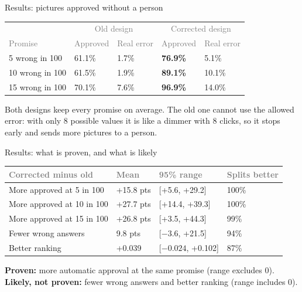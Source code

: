\documentclass[aspectratio=169,11pt]{beamer}
\newcommand{\yes}[1]{\textcolor{accent}{\textbf{#1}}}
\newcommand{\no}[1]{\textcolor{warn}{\textbf{#1}}}
\newcommand{\h}[1]{\textcolor{grey}{#1}}
\begin{document}
\begin{frame}{Results: pictures approved without a person}
\begin{tabular}{@{}L{3.2cm} C{2.6cm} C{2.2cm} C{2.6cm} C{2.2cm}@{}}
\toprule
 & \multicolumn{2}{c}{\h{Old design}} & \multicolumn{2}{c}{\h{Corrected design}}\\
\h{Promise} & \h{Approved} & \h{Real error} & \h{Approved} & \h{Real error}\\
 wrong in 100 & 61.1\% & 1.7\% & \textbf{76.9\%} & 5.1\%\\
10 wrong in 100 & 61.5\% & 1.9\% & \textbf{89.1\%} & 10.1\%\\
15 wrong in 100 & 70.1\% & 7.6\% & \textbf{96.9\%} & 14.0\%\\
\bottomrule
\end{tabular}

\vspace{0.4cm}
Both designs keep every promise on average. The old one cannot use the allowed error: with only 8 possible values it is like a dimmer with 8 clicks, so it stops early and sends more pictures to a person.
\end{frame}

\begin{frame}{Results: what is proven, and what is likely}
\begin{tabular}{@{}L{5.6cm} C{2.2cm} C{2.8cm} C{1.8cm}@{}}
\toprule
\h{Corrected minus old} & \h{Mean} & \h{95\% range} & \h{Splits better}\\
\midrule
More approved at 5 in 100 & +15.8 pts & [+5.6, +29.2] & 100\%\\
More approved at 10 in 100 & +27.7 pts & [+14.4, +39.3] & 100\%\\
More approved at 15 in 100 & +26.8 pts & [+3.5, +44.3] & 99\%\\
\midrule
Fewer wrong answers & 9.8 pts & [$-3.6$, +21.5] & 94\%\\
Better ranking & +0.039 & [$-0.024$, +0.102] & 87\%\\
\bottomrule
\end{tabular}

\vspace{0.4cm}
\yes{Proven:} more automatic approval at the same promise (range excludes 0).\\
\no{Likely, not proven:} fewer wrong answers and better ranking (range includes 0).
\end{frame}
\end{document}
